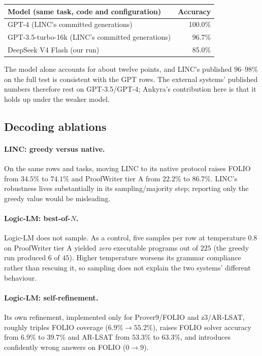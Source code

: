 \documentclass[11pt,a4paper]{article}
\begin{document}
\begin{center}
\small
\begin{tabular}{lr}
\toprule
\textbf{Model (same task, code and configuration)} & \textbf{Accuracy} \\
\midrule
GPT-4 (LINC's committed generations) & 100.0\% \\
GPT-3.5-turbo-16k (LINC's committed generations) & 96.7\% \\
DeepSeek V4 Flash (our run) & 85.0\% \\
\bottomrule
\end{tabular}
\end{center}

The model alone accounts for about twelve points, and LINC's published $96$--$98\%$ on the
full test is consistent with the GPT rows. The external systems' published numbers
therefore rest on GPT-3.5/GPT-4; Ankyra's contribution here is that it holds up under the
weaker model.

\subsection{Decoding ablations}
\label{sec:comparison-ablations}

\paragraph{LINC: greedy versus native.} On the same rows and tasks, moving LINC to its
native protocol raises FOLIO from $34.5\%$ to $74.1\%$ and ProofWriter tier A from $22.2\%$
to $86.7\%$. LINC's robustness lives substantially in its sampling/majority step; reporting
only the greedy value would be misleading.

\paragraph{Logic-LM: best-of-$N$.} Logic-LM does not sample. As a control, five samples per
row at temperature $0.8$ on ProofWriter tier A yielded \emph{zero} executable programs out
of $225$ (the greedy run produced $6$ of $45$). Higher temperature worsens its grammar
compliance rather than rescuing it, so sampling does not explain the two systems' different
behaviour.

\paragraph{Logic-LM: self-refinement.} Its own refinement, implemented only for
Prover9/FOLIO and z3/AR-LSAT, roughly triples FOLIO coverage ($6.9\%\to55.2\%$), raises
FOLIO solver accuracy from $6.9\%$ to $39.7\%$ and AR-LSAT from $53.3\%$ to $63.3\%$, and
introduces confidently wrong answers on FOLIO ($0\to9$).
\end{document}
